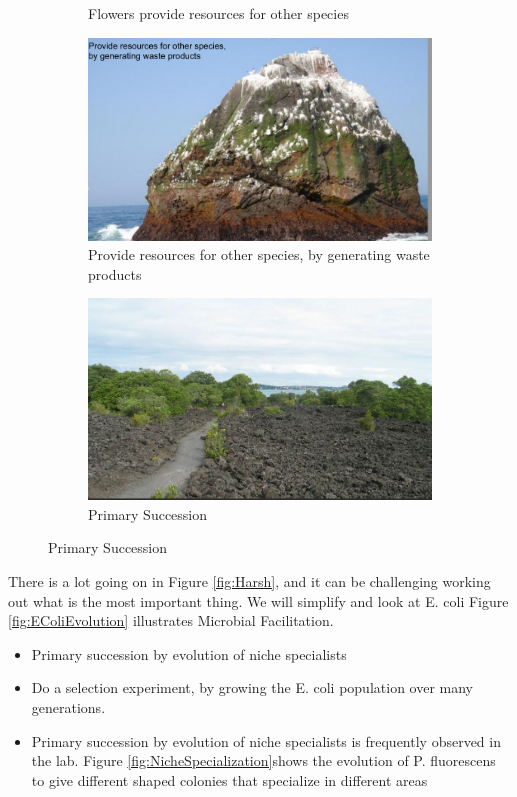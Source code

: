 \documentclass[]{article}
\begin{document}
\begin{figure}[H]
\begin{subfigure}[b]{0.45\textwidth}
		\caption{Flowers provide resources for other species}
		\label{fig:Harsh3}
	\end{subfigure}	
	\hfill
	\begin{subfigure}[b]{0.45\textwidth}
		\centering
		\includegraphics[width=\textwidth]{Harsh4}
		\caption{Provide resources for other species,
			by generating waste products}
		\label{fig:Harsh4}
	\end{subfigure}
		\hfill
	\begin{subfigure}[b]{0.45\textwidth}
		\centering
		\includegraphics[width=\textwidth]{Harsh5}
		\caption{Primary Succession}

	\end{subfigure}
\end{figure}

There is a lot going on in Figure \ref{fig:Harsh}, and it can be challenging working out what is the most important thing. We will simplify and look at E. coli
Figure \ref{fig:EColiEvolution} illustrates Microbial Facilitation.
\begin{itemize}
	\item Primary succession by evolution of niche specialists
	\item Do a selection experiment, by growing the E. coli population over many generations.
	\item Primary succession by evolution of niche specialists is frequently observed in the lab. Figure \ref{fig:NicheSpecialization}shows the evolution of P. fluorescens to give different shaped colonies that specialize in different areas 
\end{itemize}
\end{document}
